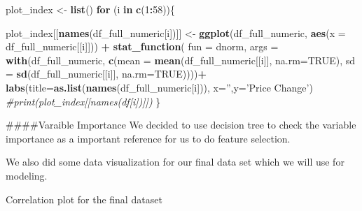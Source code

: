 \documentclass[11pt,]{article}
\newenvironment{Shaded}{\begin{snugshade}}{\end{snugshade}}
\newcommand{\CommentTok}[1]{\textcolor[rgb]{0.56,0.35,0.01}{\textit{#1}}}
\newcommand{\ControlFlowTok}[1]{\textcolor[rgb]{0.13,0.29,0.53}{\textbf{#1}}}
\newcommand{\DataTypeTok}[1]{\textcolor[rgb]{0.13,0.29,0.53}{#1}}
\newcommand{\DecValTok}[1]{\textcolor[rgb]{0.00,0.00,0.81}{#1}}
\newcommand{\KeywordTok}[1]{\textcolor[rgb]{0.13,0.29,0.53}{\textbf{#1}}}
\newcommand{\NormalTok}[1]{#1}
\newcommand{\OperatorTok}[1]{\textcolor[rgb]{0.81,0.36,0.00}{\textbf{#1}}}
\newcommand{\OtherTok}[1]{\textcolor[rgb]{0.56,0.35,0.01}{#1}}
\newcommand{\StringTok}[1]{\textcolor[rgb]{0.31,0.60,0.02}{#1}}
\begin{document}
\begin{Shaded}
\begin{Highlighting}[]
\NormalTok{plot_index <-}\StringTok{ }\KeywordTok{list}\NormalTok{()}
\ControlFlowTok{for}\NormalTok{ (i }\ControlFlowTok{in} \KeywordTok{c}\NormalTok{(}\DecValTok{1}\OperatorTok{:}\DecValTok{58}\NormalTok{))\{}
  
\NormalTok{  plot_index[[}\KeywordTok{names}\NormalTok{(df_full_numeric[i])]] <-}\StringTok{ }\KeywordTok{ggplot}\NormalTok{(df_full_numeric, }\KeywordTok{aes}\NormalTok{(}\DataTypeTok{x =}\NormalTok{ df_full_numeric[[i]])) }\OperatorTok{+}
\StringTok{    }\KeywordTok{stat_function}\NormalTok{(}
      \DataTypeTok{fun =}\NormalTok{ dnorm,}
      \DataTypeTok{args =} \KeywordTok{with}\NormalTok{(df_full_numeric, }\KeywordTok{c}\NormalTok{(}\DataTypeTok{mean =} \KeywordTok{mean}\NormalTok{(df_full_numeric[[i]], }\DataTypeTok{na.rm=}\OtherTok{TRUE}\NormalTok{), }
                            \DataTypeTok{sd =} \KeywordTok{sd}\NormalTok{(df_full_numeric[[i]], }\DataTypeTok{na.rm=}\OtherTok{TRUE}\NormalTok{))))}\OperatorTok{+}
\StringTok{    }\KeywordTok{labs}\NormalTok{(}\DataTypeTok{title=}\KeywordTok{as.list}\NormalTok{(}\KeywordTok{names}\NormalTok{(df_full_numeric[i])), }\DataTypeTok{x=}\StringTok{''}\NormalTok{,}\DataTypeTok{y=}\StringTok{'Price Change'}\NormalTok{)}
  \CommentTok{#print(plot_index[[names(df[i])]])}
\NormalTok{\}}
\end{Highlighting}
\end{Shaded}

\#\#\#\#Varaible Importance We decided to use decision tree to check the
variable importance as a important reference for us to do feature
selection.

\begin{Shaded}
\end{Shaded}

We also did some data visualization for our final data set which we will
use for modeling.

Correlation plot for the final dataset
\end{document}
